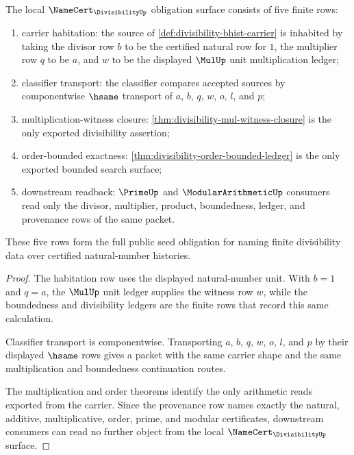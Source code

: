 \begin{theorem}
\label{thm:divisibility-namecert-obligation-surface}
The local $\NameCert_{\DivisibilityUp}$ obligation surface consists of five
finite rows:
\begin{enumerate}
\item carrier habitation: the source of
\autoref{def:divisibility-bhist-carrier} is inhabited by taking the divisor
row $b$ to be the certified natural row for $1$, the multiplier row $q$ to be
$a$, and $w$ to be the displayed $\MulUp$ unit multiplication ledger;
\item classifier transport: the classifier compares accepted sources by
componentwise $\hsame$ transport of $a$, $b$, $q$, $w$, $o$, $l$, and $p$;
\item multiplication-witness closure:
\autoref{thm:divisibility-mul-witness-closure} is the only exported
divisibility assertion;
\item order-bounded exactness:
\autoref{thm:divisibility-order-bounded-ledger} is the only exported bounded
search surface;
\item downstream readback: $\PrimeUp$ and $\ModularArithmeticUp$ consumers
read only the divisor, multiplier, product, boundedness, ledger, and
provenance rows of the same packet.
\end{enumerate}
These five rows form the full public seed obligation for naming finite
divisibility data over certified natural-number histories.
\end{theorem}
\begin{proof}
The habitation row uses the displayed natural-number unit. With $b=1$ and
$q=a$, the $\MulUp$ unit ledger supplies the witness row $w$, while the
boundedness and divisibility ledgers are the finite rows that record this
same calculation.

Classifier transport is componentwise. Transporting $a$, $b$, $q$, $w$, $o$,
$l$, and $p$ by their displayed $\hsame$ rows gives a packet with the same
carrier shape and the same multiplication and boundedness continuation
routes.

The multiplication and order theorems identify the only arithmetic reads
exported from the carrier. Since the provenance row names exactly the
natural, additive, multiplicative, order, prime, and modular certificates,
downstream consumers can read no further object from the local
$\NameCert_{\DivisibilityUp}$ surface.
\end{proof}

